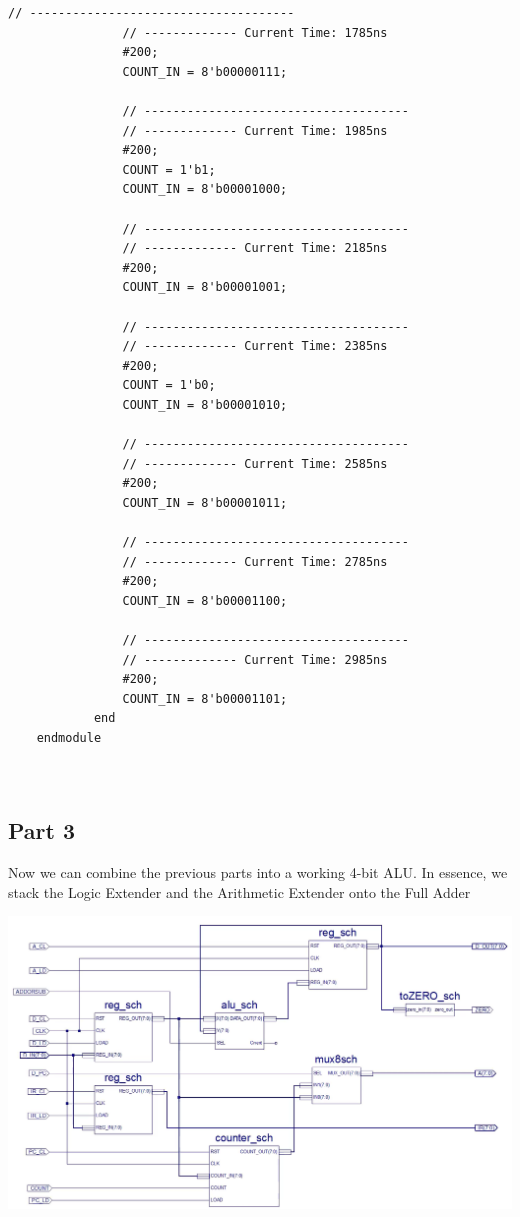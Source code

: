 \documentclass[12pt]{article}
\begin{document}
\begin{Verbatim}[frame=single, fontsize=\small]
				// -------------------------------------
				// ------------- Current Time: 1785ns 
				#200;
				COUNT_IN = 8'b00000111;
				
				// -------------------------------------
				// ------------- Current Time: 1985ns 
				#200;
				COUNT = 1'b1;
				COUNT_IN = 8'b00001000;
				
				// -------------------------------------
				// ------------- Current Time: 2185ns 
				#200;
				COUNT_IN = 8'b00001001;
				
				// -------------------------------------
				// ------------- Current Time: 2385ns 
				#200;
				COUNT = 1'b0;
				COUNT_IN = 8'b00001010;
				
				// -------------------------------------
				// ------------- Current Time: 2585ns 
				#200;
				COUNT_IN = 8'b00001011;
				
				// -------------------------------------
				// ------------- Current Time: 2785ns 
				#200;
				COUNT_IN = 8'b00001100;
				
				// -------------------------------------
				// ------------- Current Time: 2985ns 
				#200;
				COUNT_IN = 8'b00001101;
			end 
	endmodule

			
		\end{Verbatim}
\newpage
	\subsection{Part 3}
		Now we can combine the previous parts into a working 4-bit ALU. In essence, we stack the Logic Extender and the Arithmetic Extender onto the Full Adder
		\begin{center}
			\includegraphics[scale=.32]{datapath.png}
		\end{center}
\newpage
		\begin{Verbatim}[frame=single, fontsize=\small]

			
		\end{Verbatim}
		
\end{document}
